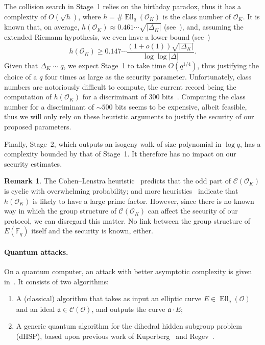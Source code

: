 \documentclass{article}
\newcommand{\F}{\mathbb{F}}
\newcommand{\Cl}{\mathcal{C}}
\renewcommand{\O}{\mathcal{O}}
\renewcommand{\frak}{\mathfrak}
\theoremstyle{definition}
\newtheorem{remark}[theorem]{Remark}
\DeclareMathOperator{\Ell}{Ell}
\begin{document}
The collision search in Stage~1 relies on the birthday paradox, thus
it has a complexity of $O(\sqrt{h})$, where $h=\#\Ell_q(\O_K)$ is the
class number of $\O_K$.  It is known that, on average,
$h(\O_K)≈0.461\cdots\sqrt{|Δ_K|}$ (see~\cite[5.10]{Cohen1993}), and,
assuming the extended Riemann hypothesis, we even have a lower bound
(see~\cite{littlewood1928class})
\[h(\O_K) ≥ 0.147\cdots\frac{(1+o(1))\sqrt{|Δ_K|}}{\log\log|Δ|}.\]
Given that $Δ_K\sim q$, we expect Stage~1 to take time $O(q^{1/4})$,
thus justifying the choice of a $q$ four times as large as the
security parameter.  Unfortunately, class numbers are notoriously
difficult to compute, the current record being the computation of
$h(\O_K)$ for a discriminant of 300
bits~\cite{10.1007/978-3-642-14081-5_15}. Computing the class
number for a discriminant of $\sim 500$ bits seems to be expensive,
albeit feasible, thus we will only rely on these heuristic arguments
to justify the security of our proposed parameters.

Finally, Stage~2,
which outputs an isogeny walk of size polynomial in $\log q$,
has a complexity bounded by that of Stage~1.
It therefore has no impact on our security estimates.

\begin{remark}
  The Cohen--Lenstra heuristic~\cite{10.1007/BFb0099440} predicts that
  the odd part of $\Cl(\O_K)$ is cyclic with overwhelming
  probability; and more heuristics~\cite{10.1007/3-540-44448-3_18}
  indicate that $h(\O_K)$ is likely to have a large prime factor.
  However, since there is no known way in which the group structure of
  $\Cl(\O_K)$ can affect the security of our protocol, we can 
  disregard this matter. No link between the group structure
	of $E(\F_q)$ itself and the security is known, either.
\end{remark}

\paragraph{Quantum attacks.}
On a quantum computer, an attack with better asymptotic complexity is
given in~\cite{childs2014constructing}. It consists of two algorithms:
\begin{enumerate}
\item A (classical) algorithm that takes as input an elliptic curve
  $E∈\Ell_q(\O)$ and an ideal $\frak a∈\Cl(\O)$, and outputs the curve
  $\frak a·E$;
\item A generic quantum algorithm for the dihedral hidden subgroup
  problem (dHSP), based upon previous work of Kuperberg~\cite{Kup} and
  Regev~\cite{regev04}.
\end{enumerate}
\end{document}
